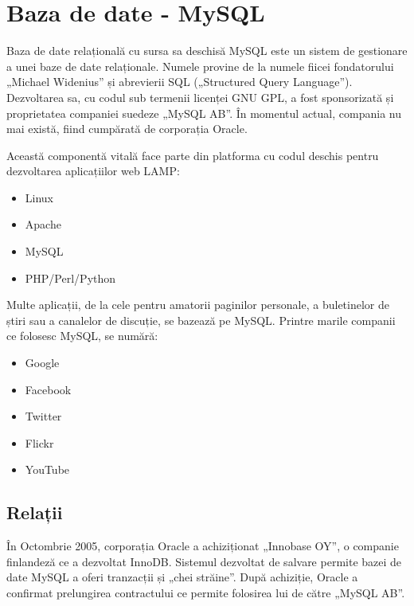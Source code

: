 \section{Baza de date - MySQL}



	Baza de date relațională cu sursa sa deschisă MySQL este un sistem de gestionare a unei baze de date relaționale.
	Numele provine de la numele fiicei fondatorului „Michael Widenius”\cite{mysql_reference} și abrevierii SQL („Structured Query Language”).
	Dezvoltarea sa, cu codul sub termenii licenței GNU GPL, a fost sponsorizată și proprietatea companiei suedeze „MySQL AB”.
	În momentul actual, compania nu mai există, fiind cumpărată de corporația Oracle.

	Această componentă vitală face parte din platforma cu codul deschis pentru dezvoltarea aplicațiilor web LAMP:
	\begin{itemize}
		\item Linux
		\item Apache
		\item MySQL
		\item PHP/Perl/Python
	\end{itemize}
	Multe aplicații, de la cele pentru amatorii paginilor personale, a buletinelor de știri sau a canalelor de discuție, se bazează pe MySQL.
	Printre marile companii ce folosesc MySQL, se numără:
	\begin{itemize}
		\item Google
		\item Facebook
		\item Twitter
		\item Flickr
		\item YouTube
	\end{itemize}


	\subsection{Relații}

	În Octombrie 2005, corporația Oracle a achiziționat „Innobase OY”, o companie finlandeză ce a dezvoltat InnoDB. \cite{innodb}
	Sistemul dezvoltat de salvare permite bazei de date MySQL a oferi tranzacții și „chei străine”.
	După achiziție, Oracle a confirmat prelungirea contractului ce permite folosirea lui de către „MySQL AB”.

